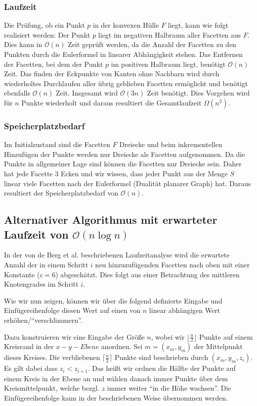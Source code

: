 \documentclass[a4paper]{article}
\begin{document}
\subsubsection*{Laufzeit}

Die Prüfung, ob ein Punkt $p$ in der konvexen Hülle $F$ liegt, kann wie folgt realisiert werden: Der Punkt $p$ liegt im negativen Halbraum aller Facetten aus $F$. Dies kann in $\mathcal{O}(n)$ Zeit geprüft werden, da die Anzahl der Facetten zu den Punkten durch die Eulerformel in linearer Abhängigkeit stehen. Das Entfernen der Facetten, bei dem der Punkt $p$ im positiven Halbraum liegt, benötigt $\mathcal{O}(n)$ Zeit. Das finden der Eckpunkte von Kanten ohne Nachbarn wird durch wiederholtes Durchlaufen aller übrig geblieben Facetten ermöglicht und benötigt ebenfalls $\mathcal{O}(n)$ Zeit. Insgesamt wird $\mathcal{O}(3n)$ Zeit benötigt. Dies Vorgehen wird für $n$ Punkte wiederholt und daraus resultiert die Gesamtlaufzeit $\Omega(n^2)$.

\subsubsection*{Speicherplatzbedarf}

Im Initialzustand sind die Facetten $F$ Dreiecke und beim inkrementellen Hinzufügen der Punkte werden nur Dreiecke als Facetten aufgenommen. Da die Punkte in allgemeiner Lage sind können die Facetten nur Dreiecke sein. Daher hat jede Facette 3 Ecken und wir wissen, dass jeder Punkt aus der Menge $S$ linear viele Facetten nach der Eulerformel (Dualität planarer Graph) hat. Daraus resultiert der Speicherplatzbedarf von $\mathcal{O}(n)$.

\subsection*{Alternativer Algorithmus mit erwarteter Laufzeit von $\mathcal{O}(n \log n)$}
In der von de Berg et al. beschriebenen Laufzeitanalyse wird die erwartete Anzahl der in einem Schritt $i$ neu hinzuzufügenden Facetten nach oben mit einer Konstante ($c = 6$) abgeschätzt.
Dies folgt aus einer Betrachtung des mittleren Knotengrades im Schritt $i$. 

Wie wir nun zeigen, können wir über die folgend definierte Eingabe und Einfügereihenfolge diesen Wert auf einen von $n$ linear abhängigen Wert erhöhen/"`verschlimmern"'.

Dazu konstruieren wir eine Eingabe der Größe $n$, wobei wir $\lfloor\frac{n}{2}\rfloor$ Punkte auf einem Kreisrand in der $x-y-Ebene$ anordnen. 
Sei $m = (x_m,y_m)$ der Mittelpunkt dieses Kreises. Die verbliebenen $\lceil\frac{n}{2}\rceil$ Punkte sind beschrieben durch $(x_m, y_m, z_i)$. Es gilt dabei dass $z_i < z_{i+1}$.
Das heißt wir ordnen die Hälfte der Punkte auf einem Kreis in der Ebene an und wählen danach immer Punkte über dem Kreismittelpunkt, welche bezgl. $z$ immer weiter 
"`in die Höhe wachsen"'. Die Einfügereihenfolge kann in der beschriebenen Weise übernommen werden.
\end{document}
